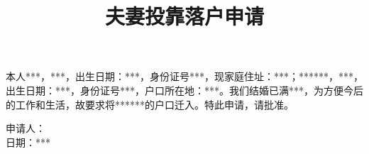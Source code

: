 \documentclass[12pt,a4paper]{article}
\author{}
\title{夫妻投靠落户申请}
\date{\vspace{-10ex}}
\newcommand{\applicantName}{***}
\newcommand{\applicantSex}{***}
\newcommand{\applicantBirthday}{***}
\newcommand{\applicantIDCardNo}{***}
\newcommand{\applicantResidentAddress}{***}
\newcommand{\spouseRelationship}{***}
\newcommand{\spouseName}{***}
\newcommand{\spouseSex}{***}
\newcommand{\spouseBirthday}{***}
\newcommand{\spouseIDCardNo}{***}
\newcommand{\spouseResidentAddress}{***}
\newcommand{\applicationDate}{***}
\newcommand{\applicationMinimumTime}{***}
\begin{document}
\maketitle
\thispagestyle{empty}
本人\applicantName，\applicantSex，出生日期：\applicantBirthday，身份证号\applicantIDCardNo，现家庭住址：\applicantResidentAddress；\spouseRelationship\spouseName，\spouseSex，出生日期：\spouseBirthday，身份证号\spouseIDCardNo，户口所在地：\spouseResidentAddress。我们结婚已满\applicationMinimumTime，为方便今后的工作和生活，故要求将\spouseRelationship\spouseName 的户口迁入。特此申请，请批准。
\begin{flushright}
申请人：　　　　　　\\
日期：\applicationDate
\end{flushright}
\end{document}
